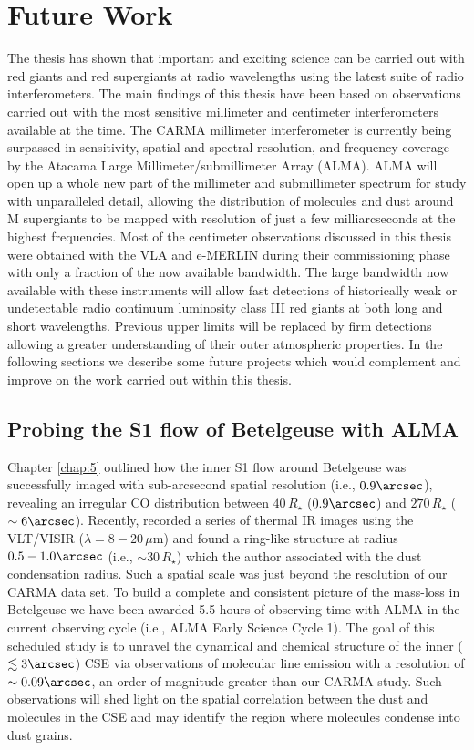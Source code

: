 \section{Future Work}\label{sec:8.2}
The thesis has shown that important and exciting science can be carried out with red giants and red supergiants at radio wavelengths using the latest suite of radio interferometers. The main findings of this thesis have been based on observations carried out with the most sensitive millimeter and centimeter interferometers available at the time. The CARMA millimeter interferometer is currently being surpassed in sensitivity, spatial and spectral resolution, and frequency coverage by the Atacama Large Millimeter/submillimeter Array (ALMA). ALMA will open up a whole new part of the millimeter and submillimeter spectrum for study with  unparalleled detail, allowing the distribution of molecules and dust around M supergiants to be mapped with resolution of just a few milliarcseconds at the highest frequencies. Most of the centimeter observations discussed in this thesis were obtained with the VLA and e-MERLIN during their commissioning phase with only a fraction of the now available bandwidth. The large bandwidth now available with these instruments will  allow fast detections of historically weak or undetectable radio continuum luminosity class III red giants at both long and short wavelengths. Previous upper limits will be replaced by firm detections allowing a greater understanding of their outer atmospheric properties. In the following sections we describe some future projects which would complement and improve on the work carried out within this thesis.

\subsection{Probing the S1 flow of Betelgeuse with ALMA}\label{sec:8.2.1}
Chapter \ref{chap:5} outlined how the inner S1 flow around Betelgeuse was successfully imaged with sub-arcsecond spatial resolution (i.e., $0.9\arcsec$), revealing an irregular CO distribution between $40\,R_{\star}$ ($0.9\arcsec$) and $270\,R_{\star}$ ($\sim 6\arcsec$). Recently, \cite{kervella_2011} recorded a series of thermal IR images using the VLT/VISIR ($\lambda = 8-20\,\mu$m) and found a ring-like structure at radius $0.5-1.0\arcsec$ (i.e., $\sim 30\,R_{\star}$) which the author associated with the dust condensation radius. Such a spatial scale was just beyond the resolution of our CARMA data set. To build a complete and consistent picture of the mass-loss in Betelgeuse we have been awarded 5.5 hours of observing time with ALMA in the current observing cycle (i.e., ALMA Early Science Cycle 1). The goal of this scheduled study is to unravel the dynamical and chemical structure of the inner ($\lesssim 3\arcsec$) CSE via observations of molecular line emission with a resolution of $\sim 0.09\arcsec$, an order of magnitude greater than our CARMA study. Such observations will shed light on the spatial correlation between the dust and molecules in the CSE and may identify the region where molecules condense into dust grains.

